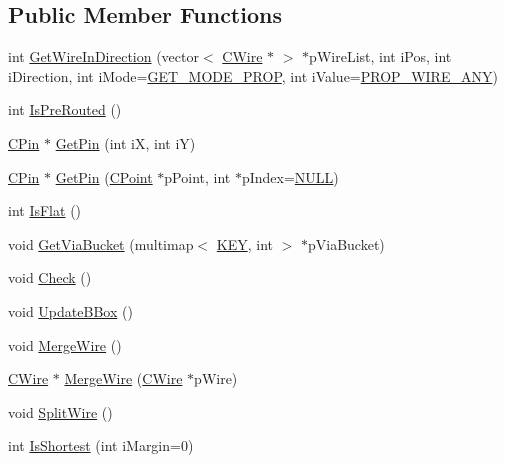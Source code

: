 \subsection*{Public Member Functions}
\begin{DoxyCompactItemize}
\item 
int \mbox{\hyperlink{classCNet_a390a24e0f9ac1ac082746d09ebb35d23}{Get\+Wire\+In\+Direction}} (vector$<$ \mbox{\hyperlink{classCWire}{C\+Wire}} $\ast$ $>$ $\ast$p\+Wire\+List, int i\+Pos, int i\+Direction, int i\+Mode=\mbox{\hyperlink{BoxRouter_8h_a678c4c2628bee05b15999bb00ded44d3}{G\+E\+T\+\_\+\+M\+O\+D\+E\+\_\+\+P\+R\+OP}}, int i\+Value=\mbox{\hyperlink{BoxRouter_8h_a3190814b5494277cd30ff3d03c8d4058}{P\+R\+O\+P\+\_\+\+W\+I\+R\+E\+\_\+\+A\+NY}})
\item 
int \mbox{\hyperlink{classCNet_aafeb3181372a95390373d89b287c7e70}{Is\+Pre\+Routed}} ()
\item 
\mbox{\hyperlink{classCPin}{C\+Pin}} $\ast$ \mbox{\hyperlink{classCNet_ad0f4f9b80de19edb6731cda71fd450a7}{Get\+Pin}} (int iX, int iY)
\item 
\mbox{\hyperlink{classCPin}{C\+Pin}} $\ast$ \mbox{\hyperlink{classCNet_a3af1e1df7ab2044f1ad50bc460e84f9c}{Get\+Pin}} (\mbox{\hyperlink{classCPoint}{C\+Point}} $\ast$p\+Point, int $\ast$p\+Index=\mbox{\hyperlink{BoxRouter_8h_a070d2ce7b6bb7e5c05602aa8c308d0c4}{N\+U\+LL}})
\item 
int \mbox{\hyperlink{classCNet_a4ceed5e43d69020526e5dd084024baa6}{Is\+Flat}} ()
\item 
void \mbox{\hyperlink{classCNet_aa8ae0a7361da9afc30dab5b36a9a6c7d}{Get\+Via\+Bucket}} (multimap$<$ \mbox{\hyperlink{res2dmp_8cpp_a8ae9d53f33f46cfcfcb9736e6351452a}{K\+EY}}, int $>$ $\ast$p\+Via\+Bucket)
\item 
void \mbox{\hyperlink{classCNet_a14518e3935990afad52bbaf4a257614c}{Check}} ()
\item 
void \mbox{\hyperlink{classCNet_a3af5b7987a5fb73488a8381a2fb21336}{Update\+B\+Box}} ()
\item 
void \mbox{\hyperlink{classCNet_a071afaff38f473f16963a9f81c39528a}{Merge\+Wire}} ()
\item 
\mbox{\hyperlink{classCWire}{C\+Wire}} $\ast$ \mbox{\hyperlink{classCNet_a5441cfbbf2201282ce1b3e402a488473}{Merge\+Wire}} (\mbox{\hyperlink{classCWire}{C\+Wire}} $\ast$p\+Wire)
\item 
void \mbox{\hyperlink{classCNet_a26430ae6a0d001620b267e1456d290a1}{Split\+Wire}} ()
\item 
int \mbox{\hyperlink{classCNet_a7bc0cfc0aa81625c0d4e36add2585262}{Is\+Shortest}} (int i\+Margin=0)

\end{DoxyCompactItemize}
